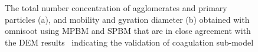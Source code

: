 \begin{figure}[H]
\begin{subfigure}[t]{0.4\textwidth}
	\end{subfigure}
	\caption{The total number concentration of agglomerates and primary particles (a), and mobility and gyration diameter (b) obtained with omnisoot using MPBM and SPBM that are in close agreement with the DEM results~\citep{kholghy2021surface} indicating the validation of coagulation sub-model}
	\label{fig:coagvalid_Nd} 
\end{figure}






